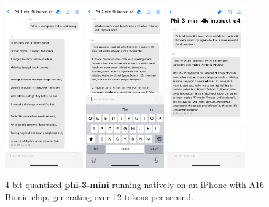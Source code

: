 \documentclass[11pt]{article}
\begin{document}
\begin{figure}
    \centering
    \includegraphics[width=0.30\textwidth]{iphone_song3.PNG}
\includegraphics[width=0.30\textwidth]{iPhone_houston3.PNG}
\includegraphics[width=0.30\textwidth]{iPhone_titlep.PNG}
    \caption{4-bit quantized \textbf{phi-3-mini} running natively on an iPhone with A16 Bionic chip, generating over 12 tokens per second.}
    \label{fig:1}
\end{figure}
\end{document}
